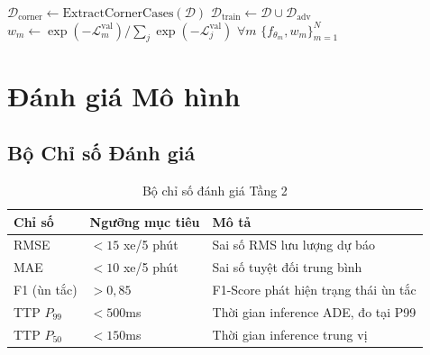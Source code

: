 \begin{algorithm}[H]
\caption{Huấn luyện ADE Surrogate Model}
\label{alg:ade_train}
\BlankLine
{}
$\mathcal{D}_{\text{corner}} \leftarrow \text{ExtractCornerCases}(\mathcal{D})$\;
\BlankLine
{}
$\mathcal{D}_{\text{train}} \leftarrow \mathcal{D} \cup \mathcal{D}_{\text{adv}}$\;
\BlankLine
{}
\BlankLine
{}
$w_m \leftarrow \exp(-\mathcal{L}_m^{\text{val}}) / \sum_{j} \exp(-\mathcal{L}_j^{\text{val}})$ \quad $\forall m$\;
\Return $\{f_{\theta_m}, w_m\}_{m=1}^{N}$
\end{algorithm}

\section{Đánh giá Mô hình}

\subsection{Bộ Chỉ số Đánh giá}

\begin{table}[H]
\centering
\caption{Bộ chỉ số đánh giá Tầng 2}
\label{tab:metrics_t2}
\renewcommand{\arraystretch}{1.4}
\begin{tabular}{p{2.5cm} p{3.5cm} p{5.5cm}}
\toprule
\textbf{Chỉ số} & \textbf{Ngưỡng mục tiêu} & \textbf{Mô tả} \\
\midrule
RMSE & $< 15$ xe/5 phút & Sai số RMS lưu lượng dự báo \\
\rowcolor{rowgray}
MAE & $< 10$ xe/5 phút & Sai số tuyệt đối trung bình \\
F1 (ùn tắc) & $> 0{,}85$ & F1-Score phát hiện trạng thái ùn tắc \\
\rowcolor{rowgray}
TTP $P_{99}$ & $< 500$ms & Thời gian inference ADE, đo tại P99 \\
TTP $P_{50}$ & $< 150$ms & Thời gian inference trung vị \\
\bottomrule
\end{tabular}
\end{table}

